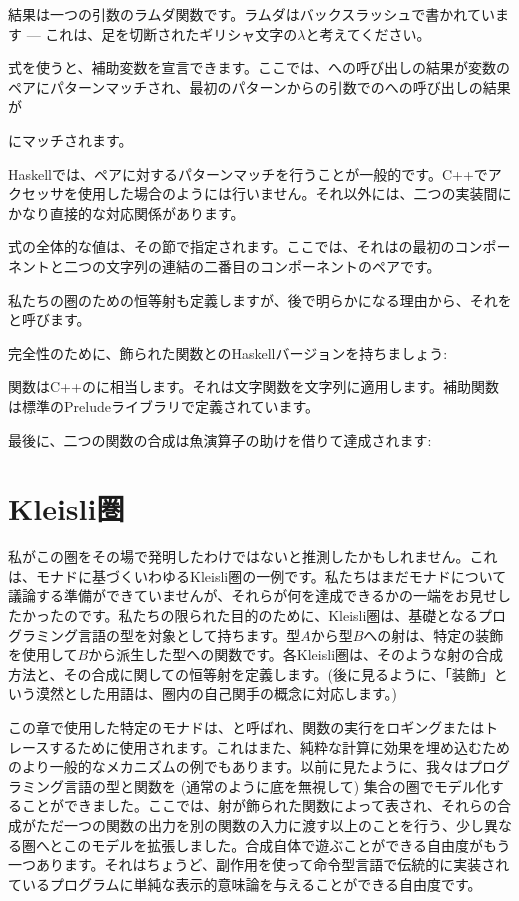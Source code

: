 結果は一つの引数のラムダ関数です。ラムダはバックスラッシュで書かれています --- これは、足を切断されたギリシャ文字の$\lambda$と考えてください。

式を使うと、補助変数を宣言できます。ここでは、への呼び出しの結果が変数のペアにパターンマッチされ、最初のパターンからの引数でのへの呼び出しの結果が

にマッチされます。

Haskellでは、ペアに対するパターンマッチを行うことが一般的です。C++でアクセッサを使用した場合のようには行いません。それ以外には、二つの実装間にかなり直接的な対応関係があります。

式の全体的な値は、その節で指定されます。ここでは、それはの最初のコンポーネントと二つの文字列の連結の二番目のコンポーネントのペアです。

私たちの圏のための恒等射も定義しますが、後で明らかになる理由から、それをと呼びます。

完全性のために、飾られた関数とのHaskellバージョンを持ちましょう:

関数はC++のに相当します。それは文字関数を文字列に適用します。補助関数は標準のPreludeライブラリで定義されています。

最後に、二つの関数の合成は魚演算子の助けを借りて達成されます:


\section{Kleisli圏}

私がこの圏をその場で発明したわけではないと推測したかもしれません。これは、モナドに基づくいわゆるKleisli圏の一例です。私たちはまだモナドについて議論する準備ができていませんが、それらが何を達成できるかの一端をお見せしたかったのです。私たちの限られた目的のために、Kleisli圏は、基礎となるプログラミング言語の型を対象として持ちます。型$A$から型$B$への射は、特定の装飾を使用して$B$から派生した型への関数です。各Kleisli圏は、そのような射の合成方法と、その合成に関しての恒等射を定義します。(後に見るように、「装飾」という漠然とした用語は、圏内の自己関手の概念に対応します。) 

この章で使用した特定のモナドは、と呼ばれ、関数の実行をロギングまたはトレースするために使用されます。これはまた、純粋な計算に効果を埋め込むためのより一般的なメカニズムの例でもあります。以前に見たように、我々はプログラミング言語の型と関数を (通常のように底を無視して) 集合の圏でモデル化することができました。ここでは、射が飾られた関数によって表され、それらの合成がただ一つの関数の出力を別の関数の入力に渡す以上のことを行う、少し異なる圏へとこのモデルを拡張しました。合成自体で遊ぶことができる自由度がもう一つあります。それはちょうど、副作用を使って命令型言語で伝統的に実装されているプログラムに単純な表示的意味論を与えることができる自由度です。

